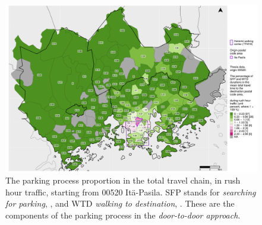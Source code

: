 
\begin{figure}
    \section{}
    \centering
    \includegraphics[trim={0.9cm 0.3cm 0.25cm 0.3cm},clip,width=\textwidth]{images/compare_traveltimes_mapfill-msc_r_pct_fromzip-00520_11-10-2020.png}
    \caption[Parking process proportion from Itä-Pasila, rush hour traffic]{The parking process proportion in the total travel chain, in rush hour traffic, starting from 00520 Itä-Pasila. SFP stands for \textit{searching for parking}, , and WTD \textit{walking to destination}, . These are the components of the parking process in the \textit{door-to-door approach}.}%
    \label{fig:compare_msc_r_pct_00520}%
\end{figure}

